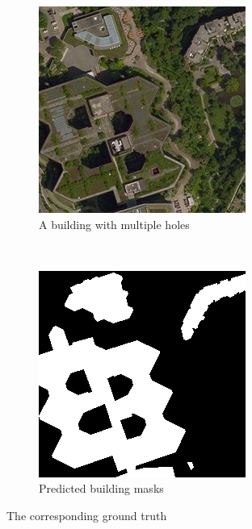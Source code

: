 \begin{figure}[H]
	\centering
	\begin{subfigure}{0.4\textwidth}
		\centering
    	\includegraphics[width=0.9\linewidth]{chapters/theoretical_and_experimental_results/images/building_with_hole.png}		    \caption{A building with multiple holes}
	\end{subfigure}~
		\begin{subfigure}{0.4\textwidth}
		\centering
    	\includegraphics[width=0.9\linewidth]{chapters/theoretical_and_experimental_results/images/building_with_hole_gt.png}		    \caption{Predicted building masks}
	\end{subfigure}
	\caption{The corresponding ground truth}
	\label{fig:results:buildings_with_holes_gt}
\end{figure}
